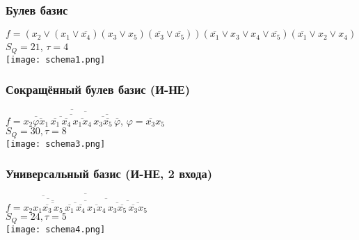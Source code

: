 \documentclass[12pt,a4paper]{report}
\begin{document}
\subsubsection*{Булев базис}
$f=(x_2\vee (x_1 \vee \overline{x_4})(x_3\vee x_5)(\overline{x_3}\vee \overline{x_5}))(\overline{x_1} \vee x_3 \vee x_4 \vee \overline{x_5})(\overline{x_1} \vee x_2 \vee x_4)$\\ $S_Q=21$, $\tau=4$\\
\hfill\break
\texttt{[image: schema1.png]}\\
\subsubsection*{Сокращённый булев базис (И-НЕ)}
$f=\overline{\overline{x_2\overline{\varphi x_1}}\,\overline{\overline{\overline{\overline{x_1}\,\overline{x_4}}\,\overline{x_1 x_4}}\,\overline{\overline{x_3\overline{x_5}}\,\overline{\varphi}}}}$, $\varphi=\overline{x_3}x_5$\\
$S_Q=30, \tau=8$\\
\texttt{[image: schema3.png]}
\newpage
\subsubsection*{Универсальный базис (И-НЕ, 2 входа)}
$f=\overline{\overline{x_2\overline{x_1\overline{\overline{\overline{x_3}\,x_5}}}}\,\overline{\overline{\overline{\overline{x_1}\,\overline{x_4}}\,\overline{x_1x_4}}\,\overline{\overline{x_3\overline{x_5}}\,\overline{\overline{x_3}x_5}}}}$\\
$S_Q=24, \tau=5$\\
\texttt{[image: schema4.png]}
\end{document}
